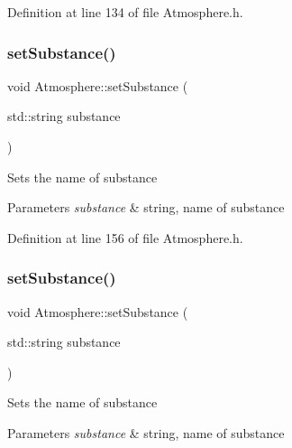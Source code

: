 Definition at line 134 of file Atmosphere.\+h.

\mbox{\label{class_atmosphere_aa92f55a1f07304f3e57fdfb8ece65d82}} 
\subsubsection{\texorpdfstring{set\+Substance()}{setSubstance()}\hspace{0.1cm}{\footnotesize\ttfamily [1/3]}}
{\footnotesize\ttfamily void Atmosphere\+::set\+Substance (\begin{DoxyParamCaption}\item[{std\+::string}]{substance }\end{DoxyParamCaption})\hspace{0.3cm}{\ttfamily [inline]}}

Sets the name of substance 
\begin{DoxyParams}{Parameters}
{\em substance} & string, name of substance \\
\hline
\end{DoxyParams}


Definition at line 156 of file Atmosphere.\+h.

\mbox{\label{class_atmosphere_aa92f55a1f07304f3e57fdfb8ece65d82}} 
\subsubsection{\texorpdfstring{set\+Substance()}{setSubstance()}\hspace{0.1cm}{\footnotesize\ttfamily [2/3]}}
{\footnotesize\ttfamily void Atmosphere\+::set\+Substance (\begin{DoxyParamCaption}\item[{std\+::string}]{substance }\end{DoxyParamCaption})\hspace{0.3cm}{\ttfamily [inline]}}

Sets the name of substance 
\begin{DoxyParams}{Parameters}
{\em substance} & string, name of substance \\
\hline
\end{DoxyParams}


